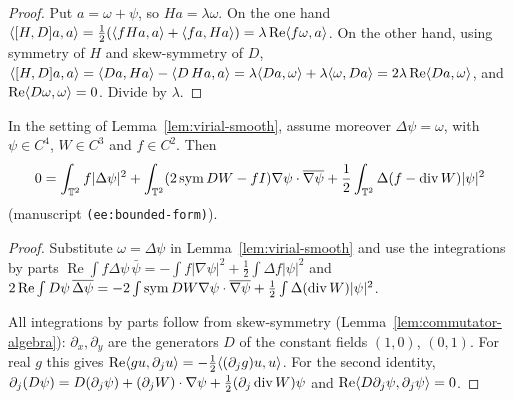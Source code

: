 \begin{proof}
\leanok
Put $a=\omega+\psi$, so $Ha=\lambda\omega$. On the one hand
$\langle [H,D]a,a\rangle=\tfrac12(\langle fHa,a\rangle+\langle fa,Ha\rangle)
=\lambda\operatorname{Re}\langle f\omega,a\rangle$. On the other hand, using
symmetry of $H$ and skew-symmetry of $D$,
$\langle [H,D]a,a\rangle=\langle Da,Ha\rangle-\langle D\,Ha,a\rangle
=\lambda\langle Da,\omega\rangle+\lambda\langle \omega,Da\rangle
=2\lambda\operatorname{Re}\langle Da,\omega\rangle$, and
$\operatorname{Re}\langle D\omega,\omega\rangle=0$. Divide by $\lambda$.
\end{proof}

\begin{lemma}
\label{lem:virial-smooth-quadratic}
\leanok
In the setting of Lemma~\ref{lem:virial-smooth}, assume moreover $\Delta\psi=\omega$,
with $\psi\in C^4$, $W\in C^3$ and $f\in C^2$. Then
\[
  0=\int_{\mathbb{T}^2}f|\Delta\psi|^2
   +\int_{\mathbb{T}^2}(2\operatorname{sym} DW-fI)\nabla\psi\cdot\overline{\nabla\psi}
   +\frac12\int_{\mathbb{T}^2}\Delta(f-\operatorname{div} W)|\psi|^2
\]
(manuscript \texttt{(ee:bounded-form)}).
\end{lemma}

\begin{proof}
\leanok
Substitute $\omega=\Delta\psi$ in Lemma~\ref{lem:virial-smooth} and use the
integrations by parts
$\operatorname{Re}\int f\Delta\psi\,\bar\psi=-\int f|\nabla\psi|^2
+\tfrac12\int\Delta f|\psi|^2$ and
$2\operatorname{Re}\int D\psi\,\overline{\Delta\psi}
=-2\int\operatorname{sym} DW\nabla\psi\cdot\overline{\nabla\psi}+\tfrac12\int\Delta(\operatorname{div} W)|\psi|^2$.

All integrations by parts follow from skew-symmetry
(Lemma~\ref{lem:commutator-algebra}): $\partial_x,\partial_y$ are the generators $D$
of the constant fields $(1,0)$, $(0,1)$. For real $g$ this gives
$\operatorname{Re}\langle gu,\partial_ju\rangle=-\tfrac12\langle (\partial_jg)u,u\rangle$. For the second
identity, $\partial_j(D\psi)=D(\partial_j\psi)+(\partial_jW)\cdot\nabla\psi
+\tfrac12(\partial_j\operatorname{div} W)\psi$ and $\operatorname{Re}\langle D\partial_j\psi,\partial_j\psi\rangle=0$.
\end{proof}


